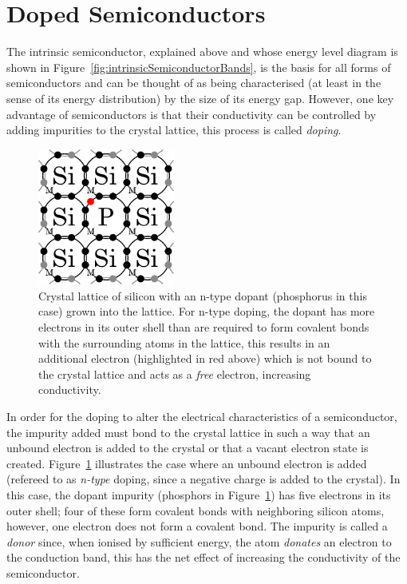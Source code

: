 \section{Doped Semiconductors}\label{sec:doped-semiconductors}
The intrinsic semiconductor, explained above and whose energy level diagram is shown in Figure~\ref{fig:intrinsicSemiconductorBands}, is the basis for all forms of semiconductors and can be thought of as being characterised (at least in the sense of its energy distribution) by the size of its energy gap. However, one key advantage of semiconductors is that their conductivity can be controlled by adding impurities to the crystal lattice, this process is called \textit{doping}.
\begin{figure}[t]
\begin{center}
\includegraphics[width = 0.4\textwidth]{figures/n_type_doping}
\caption[Crystal lattice of silicon with an n-type dopant inserted.]{Crystal lattice of silicon with an n-type dopant (phosphorus in this case) grown into the lattice. For n-type doping, the dopant has more electrons in its outer shell than are required to form covalent bonds with the surrounding atoms in the lattice, this results in an additional electron (highlighted in red above) which is not bound to the crystal lattice and acts as a \textit{free} electron, increasing conductivity.}
\label{fig:nTypeDoing}
\end{center}
\end{figure}
\par
In order for the doping to alter the electrical characteristics of a semiconductor, the impurity added must bond to the crystal lattice in such a way that an unbound electron is added to the crystal or that a vacant electron state is created. Figure~\ref{fig:nTypeDoing} illustrates the case where an unbound electron is added (refereed to as \textit{n-type} doping, since a negative charge is added to the crystal). In this case, the dopant impurity (phosphors in Figure~\ref{fig:nTypeDoing}) has five electrons in its outer shell; four of these form covalent bonds with neighboring silicon atoms, however, one electron does not form a covalent bond. The impurity is called a \textit{donor} since, when ionised by sufficient energy, the atom \textit{donates} an electron to the conduction band, this has the net effect of increasing the conductivity of the semiconductor.
